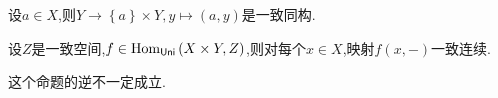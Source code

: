\begin{proposition}{}{}
	设$a\in X$,则$Y\to\left\{a\right\}\times Y,y\mapsto\left(a,y\right)$是一致同构.
\end{proposition}

\begin{proposition}{}{}
	设$Z$是一致空间,$f\in\operatorname{Hom}_{\mathsf{Uni}}\left(X\times Y,Z\right)$,则对每个$x\in X$,映射$f\left(x,-\right)$一致连续.
\end{proposition}

\begin{remark}{}{}
	这个命题的逆不一定成立.
\end{remark}